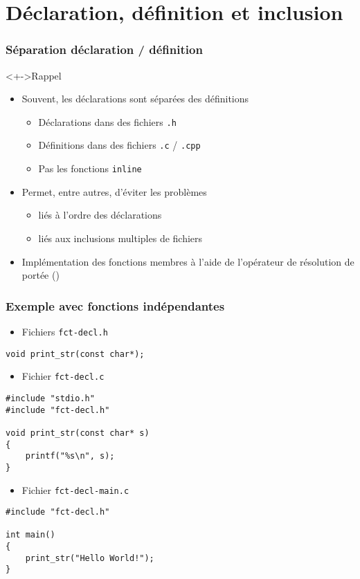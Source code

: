 \section{Déclaration, définition et inclusion}

\begin{frame}
\frametitle{Séparation déclaration / définition}
\begin{exampleblock}<+->{Rappel}
	\begin{itemize}[<+->]
	\item Souvent, les déclarations sont séparées des définitions
		\begin{itemize}
		\item Déclarations dans des fichiers \texttt{.h}
		\item Définitions dans des fichiers \texttt{.c} / \texttt{.cpp}
		\item Pas les fonctions \lstinline|inline|
		\end{itemize}
	\item Permet, entre autres, d'éviter les problèmes
		\begin{itemize}
		\item liés à l'ordre des déclarations
		\item liés aux inclusions multiples de fichiers 
		\end{itemize}
	\end{itemize}	
\end{exampleblock}
\begin{itemize}[<+->]
\item Implémentation des fonctions membres à l'aide de l'opérateur de résolution de portée (\cpp)
\end{itemize}
\end{frame}

\begin{frame}[containsverbatim]
\frametitle{Exemple avec fonctions indépendantes}
\begin{itemize}
\item Fichiers \texttt{fct-decl.h}
\end{itemize}
\begin{lstlisting}
void print_str(const char*);
\end{lstlisting}
\begin{itemize}
\item Fichier \texttt{fct-decl.c}
\end{itemize}
\begin{lstlisting}
#include "stdio.h"
#include "fct-decl.h"

void print_str(const char* s)
{
	printf("%s\n", s);
}
\end{lstlisting}
\begin{itemize}
\item Fichier \texttt{fct-decl-main.c}
\end{itemize}
\begin{lstlisting}
#include "fct-decl.h"

int main()
{
	print_str("Hello World!");
}
\end{lstlisting}
\end{frame}

